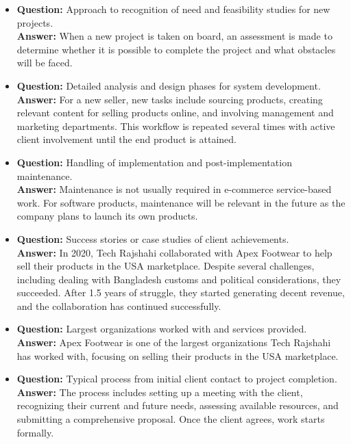 \documentclass[12pt,a4paper]{article}
\begin{document}
\begin{itemize}
    \item \textbf{Question:} Approach to recognition of need and feasibility studies for new projects.\\
    \textbf{Answer:} When a new project is taken on board, an assessment is made to determine whether it is possible to complete the project and what obstacles will be faced.

    \item \textbf{Question:} Detailed analysis and design phases for system development.\\
    \textbf{Answer:} For a new seller, new tasks include sourcing products, creating relevant content for selling products online, and involving management and marketing departments. This workflow is repeated several times with active client involvement until the end product is attained.

    \item \textbf{Question:} Handling of implementation and post-implementation maintenance.\\
    \textbf{Answer:} Maintenance is not usually required in e-commerce service-based work. For software products, maintenance will be relevant in the future as the company plans to launch its own products.

    \item \textbf{Question:} Success stories or case studies of client achievements.\\
    \textbf{Answer:} In 2020, Tech Rajshahi collaborated with Apex Footwear to help sell their products in the USA marketplace. Despite several challenges, including dealing with Bangladesh customs and political considerations, they succeeded. After 1.5 years of struggle, they started generating decent revenue, and the collaboration has continued successfully.

    \item \textbf{Question:} Largest organizations worked with and services provided.\\
    \textbf{Answer:} Apex Footwear is one of the largest organizations Tech Rajshahi has worked with, focusing on selling their products in the USA marketplace.

    \item \textbf{Question:} Typical process from initial client contact to project completion.\\
    \textbf{Answer:} The process includes setting up a meeting with the client, recognizing their current and future needs, assessing available resources, and submitting a comprehensive proposal. Once the client agrees, work starts formally.
\end{itemize}
\end{document}
